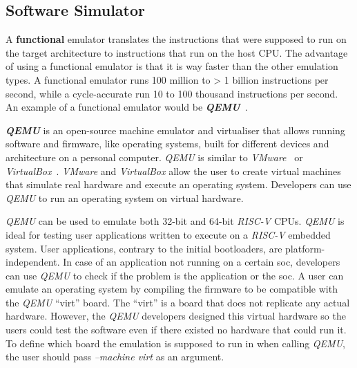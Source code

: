 \subsection{Software Simulator}

A \textbf{functional} emulator translates the instructions that were supposed to run on the target architecture to instructions that run on the host CPU. The advantage of using a functional emulator is that it is way faster than the other emulation types. A functional emulator runs 100 million to > 1 billion instructions per second, while a cycle-accurate run 10 to 100 thousand instructions per second. An example of a functional emulator would be \textbf{\textit{QEMU}}~\cite{bellard2005qemu}.

\textbf{\textit{QEMU}} is an open-source machine emulator and virtualiser that allows running software and firmware, like operating systems, built for different devices and architecture on a personal computer. \textit{QEMU} is similar to \textit{VMware}~\cite{bugnion2012bringing} or \textit{VirtualBox}~\cite{oracle2015virtualbox}. \textit{VMware} and \textit{VirtualBox} allow the user to create virtual machines that simulate real hardware and execute an operating system. Developers can use \textit{QEMU} to run an operating system on virtual hardware.

\textit{QEMU} can be used to emulate both 32-bit and 64-bit \textit{RISC-V} CPUs. \textit{QEMU} is ideal for testing user applications written to execute on a \textit{RISC-V} embedded system. User applications, contrary to the initial bootloaders, are platform-independent. In case of an application not running on a certain \acrshort{soc}, developers can use \textit{QEMU} to check if the problem is the application or the \acrshort{soc}. A user can emulate an operating system by compiling the firmware to be compatible with the \textit{QEMU} \enquote{virt} board. The \enquote{virt} is a board that does not replicate any actual hardware. However, the \textit{QEMU} developers designed this virtual hardware so the users could test the software even if there existed no hardware that could run it. To define which board the emulation is supposed to run in when calling \textit{QEMU}, the user should pass \textit{--machine virt} as an argument.
